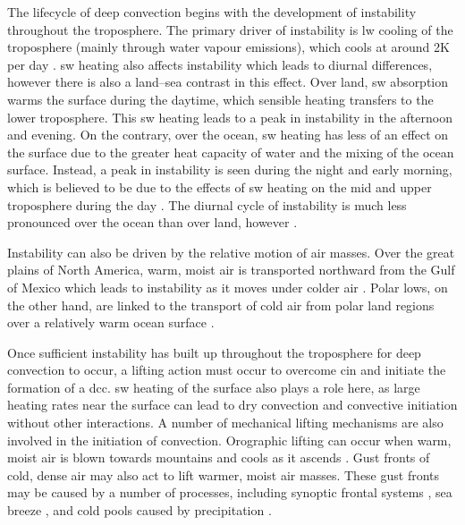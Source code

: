 The lifecycle of deep convection begins with the development of instability throughout the troposphere. 
The primary driver of instability is \acrshort{lw} cooling of the troposphere (mainly through water vapour emissions), which cools at around 2K per day \citep{jeevanjee_simple_2020}. 
\acrshort{sw} heating also affects instability which leads to diurnal differences, however there is also a land--sea contrast in this effect. 
Over land, \acrshort{sw} absorption warms the surface during the daytime, which sensible heating transfers to the lower troposphere. 
This \acrshort{sw} heating leads to a peak in instability in the afternoon and evening. On the contrary, over the ocean, \acrshort{sw} heating has less of an effect on the surface due to the greater heat capacity of water and the mixing of the ocean surface. 
Instead, a peak in instability is seen during the night and early morning, which is believed to be due to the effects of \acrshort{sw} heating on the mid and upper troposphere during the day \citep{wall_life_2018}. 
The diurnal cycle of instability is much less pronounced over the ocean than over land, however \citep{taylor_evaluating_2017}.

Instability can also be driven by the relative motion of air masses. 
Over the great plains of North America, warm, moist air is transported northward from the Gulf of Mexico which leads to instability as it moves under colder air \citep{walters_airflow_2001}. 
Polar lows, on the other hand, are linked to the transport of cold air from polar land regions over a relatively warm ocean surface \citep{moreno-ibanez_recent_2021}.

Once sufficient instability has built up throughout the troposphere for deep convection to occur, a lifting action must occur to overcome \acrshort{cin} and initiate the formation of a \acrshort{dcc}. 
\acrshort{sw} heating of the surface also plays a role here, as large heating rates near the surface can lead to dry convection and convective initiation without other interactions. 
A number of mechanical lifting mechanisms are also involved in the initiation of convection. Orographic lifting can occur when warm, moist air is blown towards mountains and cools as it ascends \citep{hodges_distribution_1997}. 
Gust fronts of cold, dense air may also act to lift warmer, moist air masses. 
These gust fronts may be caused by a number of processes, including synoptic frontal systems \citep{wilson_initiation_1986, jirak_observational_2007}, sea breeze \citep{tripoli_numerical_1979, park_environmental_2020}, and cold pools caused by precipitation \citep{grant_cold_2016}.

